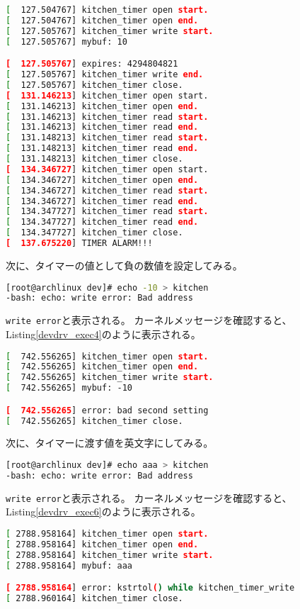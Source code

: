 \documentclass[main]{subfiles}
\begin{document}
\begin{lstlisting}[label=devdrv_exec2,caption=\texttt{dmesg}でカーネルメッセージを読む,language=sh]
[  127.504767] kitchen_timer open start.
[  127.504767] kitchen_timer open end.
[  127.505767] kitchen_timer write start.
[  127.505767] mybuf: 10

[  127.505767] expires: 4294804821
[  127.505767] kitchen_timer write end.
[  127.505767] kitchen_timer close.
[  131.146213] kitchen_timer open start.
[  131.146213] kitchen_timer open end.
[  131.146213] kitchen_timer read start.
[  131.146213] kitchen_timer read end.
[  131.148213] kitchen_timer read start.
[  131.148213] kitchen_timer read end.
[  131.148213] kitchen_timer close.
[  134.346727] kitchen_timer open start.
[  134.346727] kitchen_timer open end.
[  134.346727] kitchen_timer read start.
[  134.346727] kitchen_timer read end.
[  134.347727] kitchen_timer read start.
[  134.347727] kitchen_timer read end.
[  134.347727] kitchen_timer close.
[  137.675220] TIMER ALARM!!!
\end{lstlisting}

次に、タイマーの値として負の数値を設定してみる。

\begin{lstlisting}[label=devdrv_exec3,caption=タイマーに負の値を設定する,language=sh]
[root@archlinux dev]# echo -10 > kitchen
-bash: echo: write error: Bad address
\end{lstlisting}

\texttt{write error}と表示される。
カーネルメッセージを確認すると、Listing\ref{devdrv_exec4}のように表示される。

\begin{lstlisting}[label=devdrv_exec4,caption=負の値を設定した時のカーネルメッセージ,language=sh]
[  742.556265] kitchen_timer open start.
[  742.556265] kitchen_timer open end.
[  742.556265] kitchen_timer write start.
[  742.556265] mybuf: -10

[  742.556265] error: bad second setting
[  742.556265] kitchen_timer close.
\end{lstlisting}

次に、タイマーに渡す値を英文字にしてみる。

\begin{lstlisting}[label=devdrv_exec5,caption=タイマーに英文字を設定する,language=sh]
[root@archlinux dev]# echo aaa > kitchen
-bash: echo: write error: Bad address
\end{lstlisting}

\texttt{write error}と表示される。
カーネルメッセージを確認すると、Listing\ref{devdrv_exec6}のように表示される。

\begin{lstlisting}[label=devdrv_exec6,caption=英文字を設定した時のカーネルメッセージ,language=sh]
[ 2788.958164] kitchen_timer open start.
[ 2788.958164] kitchen_timer open end.
[ 2788.958164] kitchen_timer write start.
[ 2788.958164] mybuf: aaa

[ 2788.958164] error: kstrtol() while kitchen_timer_write
[ 2788.960164] kitchen_timer close.
\end{lstlisting}
\end{document}
